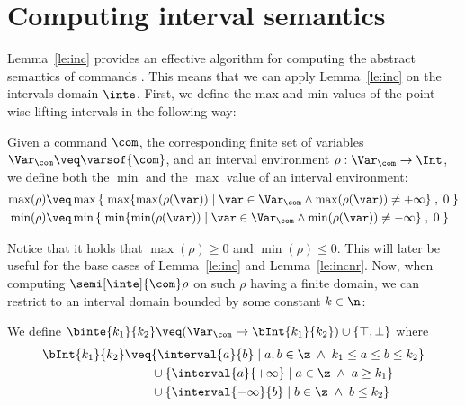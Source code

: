 \section{Computing interval semantics}\label{sec:computingint}

Lemma~\ref{le:inc} provides an effective algorithm for computing the abstract
semantics of commands%
. This means that we can apply Lemma~\ref{le:inc} on the intervals
domain \(\inte\).  First, we define the max and min values of the
point wise lifting intervals in the following way:

\begin{definition}\label{def:minmax}
  Given a command \(\com\), the corresponding finite set of variables
  \(\Var_{\com} \veq \varsof{\com}\), and an interval environment
  \(\rho : \Var_{\com} \to \Int\), we define both the \(\min\) and the
  \(\max\) value of an interval environment:
  \begin{align*}
    \max(\rho) & \veq \max\left\{\; \max \{ \max(\rho(\var)) \mid \var \in \Var_{\com} \land \max(\rho(\var)) \neq + \infty\} \; , \; 0 \; \right\} \\
    \min(\rho) & \veq \min\left\{\; \min \{ \min(\rho(\var)) \mid \var \in \Var_{\com} \land \min(\rho(\var)) \neq - \infty\} \; , \; 0 \; \right\}
  \end{align*}
\end{definition}
% 
Notice that it holds that \(\max(\rho) \geq 0\) and
\(\min(\rho) \leq 0\). This will later be useful for the base cases of
Lemma~\ref{le:inc} and Lemma~\ref{le:incnr}.  Now, when computing
\(\semi[\inte]{\com} \rho\) on such \(\rho\) having a finite domain,
we can restrict to an interval domain bounded by some constant
\(k\in\n\):

\begin{definition}\label{def:boundedint}
  We define
  \(\binte{k_1}{k_2} \veq (\Var_{\com} \to \bInt{k_1}{k_2}) \cup
  \{\top, \bot\}\) where
  \begin{align*}
    \bInt{k_1}{k_2} & \veq \{ \interval{a}{b} \mid a, b \in \z \; \land \; k_1 \leq a \leq b \leq k_2\} \\
                    & \phantom{\veq} \cup \{\interval{a}{+\infty} \mid a \in \z \; \land \; a \geq k_1\} \\
                    & \phantom{\veq} \cup \{\interval{-\infty}{b} \mid b \in \z \; \land \; b \leq k_2\}
  \end{align*}
\end{definition}


